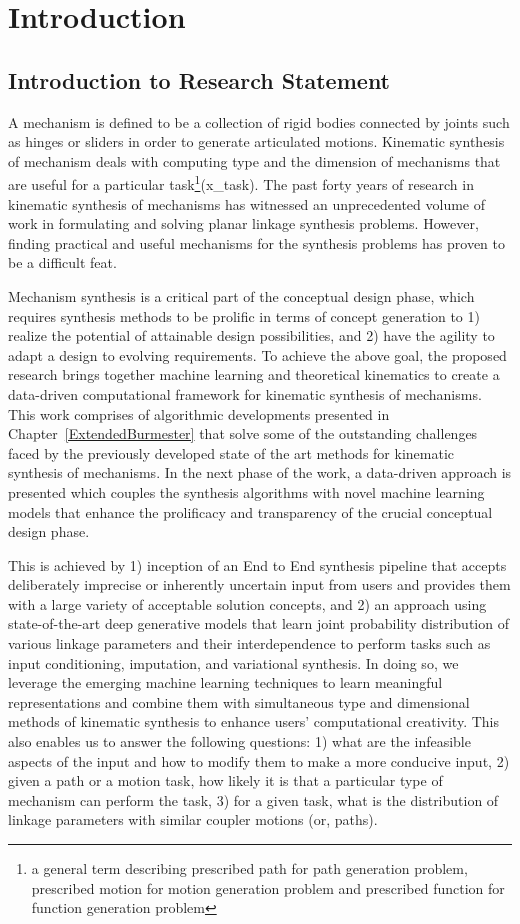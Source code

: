 \chapter{Introduction}

\section{Introduction to Research Statement}
A mechanism is defined to be a collection of rigid bodies connected by joints such as hinges or sliders in order to generate articulated motions. Kinematic synthesis of mechanism deals with computing type and the dimension of mechanisms that are useful for a particular task\footnote{a general term describing prescribed path for path generation problem, prescribed motion for motion generation problem and prescribed function for function generation problem}(\ac{x_task}).
The past forty years of research in kinematic synthesis of mechanisms has witnessed an unprecedented volume of work in formulating and solving planar linkage synthesis problems.
However, finding practical and useful mechanisms for the synthesis problems has proven to be a difficult feat.

Mechanism synthesis is a critical part of the conceptual design phase, which requires synthesis methods to be prolific in terms of concept generation to 1) realize the potential of attainable design possibilities, and 2) have the agility to adapt a design to evolving requirements.
To achieve the above goal, the proposed research brings together machine learning and theoretical kinematics to create a data-driven computational framework for kinematic synthesis of mechanisms.
This work comprises of algorithmic developments presented in Chapter~\ref{ExtendedBurmester} that solve some of the outstanding challenges faced by the previously developed state of the art methods for kinematic synthesis of mechanisms.
In the next phase of the work, a data-driven approach is presented which couples the synthesis algorithms with novel machine learning models that enhance the prolificacy and transparency of the crucial conceptual design phase.

This is achieved by 1) inception of an End to End synthesis pipeline that accepts deliberately imprecise or inherently uncertain input from users and provides them with a large variety of acceptable solution concepts, and 2) an approach using state-of-the-art deep generative models that learn joint probability distribution of various linkage parameters and their interdependence to perform tasks such as input conditioning, imputation, and variational synthesis.
In doing so, we leverage the emerging machine learning techniques to learn meaningful representations and combine them with simultaneous type and dimensional methods of kinematic synthesis to enhance users' computational creativity.
This also enables us to answer the following questions: 
1) what are the infeasible aspects of the input and how to modify them to make a more conducive input,
2) given a path or a motion task, how likely it is that a particular type of mechanism can perform the task, 3) for a given task, what is the distribution of linkage parameters with similar coupler motions (or, paths).

